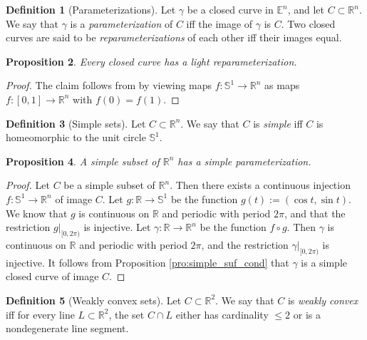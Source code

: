 \documentclass{amsart}
\newtheorem{proposition}{Proposition}[section]
\theoremstyle{definition}
\newtheorem{definition}[proposition]{Definition}
\theoremstyle{remark}
\begin{document}
\begin{definition}[Parameterizations]
    Let $\gamma$ be a closed curve in $\mathbb{E}^n$,
    and let $C\subset\mathbb{R}^n$.
    We say that $\gamma$ is a \emph{parameterization}
    of $C$ iff the image of $\gamma$ is $C$.
    Two closed curves are said to be
    \emph{reparameterizations} of each other
    iff their images equal.
\end{definition}

\begin{proposition}
    \label{pro:light_repar}
    Every closed curve has a light reparameterization.
\end{proposition}

\begin{proof}
    The claim follows from \cite[Corollary 13.4]{nadler}
    by viewing maps $f:\mathbb{S}^1\to\mathbb{R}^n$
    as maps $f:[0,1]\to\mathbb{R}^n$ with $f(0)=f(1)$.
\end{proof}

\begin{definition}[Simple sets]
    Let $C\subset\mathbb{R}^n$.
    We say that $C$ is \emph{simple}
    iff $C$ is homeomorphic to
    the unit circle $\mathbb{S}^1$.
\end{definition}

\begin{proposition}
    \label{pro:simple_par}
    A simple subset of $\mathbb{R}^n$ has
    a simple parameterization.
\end{proposition}

\begin{proof}
    Let $C$ be a simple subset of $\mathbb{R}^n$.
    Then there exists a continuous injection
    $f:\mathbb{S}^1\to\mathbb{R}^n$ of image $C$.
    Let $g:\mathbb{R}\to\mathbb{S}^1$ be the function
    $g(t):=(\cos t,\sin t)$. We know that $g$ is continuous
    on $\mathbb{R}$ and periodic with period $2\pi$, and that
    the restriction $g|_{[0,2\pi)}$ is injective.
    Let $\gamma:\mathbb{R}\to\mathbb{R}^n$ be the function
    $f\circ g$. Then $\gamma$ is continuous
    on $\mathbb{R}$ and periodic with period $2\pi$, and the
    restriction $\gamma|_{[0,2\pi)}$ is injective.
    It follows from Proposition \ref{pro:simple_suf_cond}
    that $\gamma$ is a simple closed curve of image $C$.
\end{proof}

\begin{definition}[Weakly convex sets]
    Let $C\subset\mathbb{R}^2$. We say that $C$ is \emph{weakly convex}
    iff for every line $L\subset\mathbb{R}^2$, the set $C\cap L$
    either has cardinality $\le2$ or is a nondegenerate line segment.
\end{definition}
\end{document}
